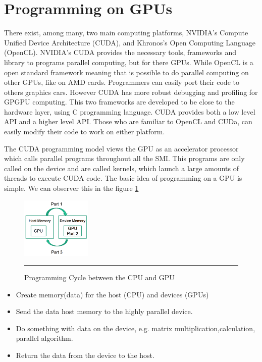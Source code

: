 \section{Programming on GPUs}

There exist, among many, two main computing platforms, NVIDIA's Compute Unified Device Architecture (CUDA), and Khronos's Open Computing Language (OpenCL). NVIDIA's CUDA provides the necessary tools, frameworks and library to programs parallel computing, but for there GPUs. While OpenCL is a open standard framework meaning that is possible to do parallel computing on other GPUs, like on AMD cards. Programmers can easily port their code to others graphics cars.  However CUDA has more robust debugging and profiling for GPGPU computing. This two frameworks are developed to be close to the hardware layer, using C programming language. CUDA provides both a low level API and a higher level API. Those who are familiar to OpenCL and CUDa, can easily modify their code to work on either platform.\cite{hwu}


The CUDA programming model views the GPU as an accelerator processor which calls parallel programs  throughout all the SMI. This programs are only called on the device and are called kernels, which launch a large amounts of threads to execute CUDA code. The basic idea of programming on a GPU is simple. We can observer this in the figure \ref{fig:cycle}

\begin{figure}[htbp]
	\centering
		\includegraphics[width=0.3\textwidth]{Figures/cycle.png}
		\rule{35em}{0.5pt}
	\caption[Programming Cycle]{Programming Cycle between the CPU and GPU}
	\label{fig:cycle}
\end{figure}


\begin{itemize}
\item Create memory(data) for the host (CPU) and devices (GPUs)
\item Send the data host memory to the highly parallel device.
\item Do something with data on the device, e.g. matrix multiplication,calculation, parallel algorithm.
\item Return the data from the device to the host.
\end{itemize}

